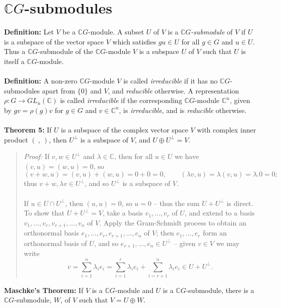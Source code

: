 \section {${\mathbb C}G$-submodules}
{\bf Definition:} Let $V$ be a ${\mathbb C}G$-module. A subset $U$ of
$V$ is a \emph{${\mathbb C}G$-submodule} of $V$ if $U$ is a subspace of the vector
space $V$ which satisfies $gu\in U$ for all $g\in G$ and $u\in U$.
Thus a ${\mathbb C}G$-submodule of the ${\mathbb C}G$-module $V$ is a subspace $U$ of $V$ such
that $U$ is itself a ${\mathbb C}G$-module.
\\
\\
{\bf Definition:}
A non-zero ${\mathbb C}G$-module $V$ is called
\emph{irreducible} if it has no ${\mathbb C}G$-submodules apart from
$\{0\}$ and $V$, and
\emph{reducible} otherwise. A representation $\rho:G\rightarrow GL_n({\mathbb C})$ is
called \emph{irreducible} if the corresponding ${\mathbb C}G$-module ${\mathbb C}^n$, given by
$gv=\rho(g)v$ for $g\in G$ and $v \in {\mathbb C}^n$, is \emph{irreducible}, and is
\emph{reducible} otherwise.
\\
\\
{\bf Theorem 5:} If $U$ is a subspace of the complex vector
space $V$ with complex inner product $(\ ,\ )$, then $U^\perp$ is a subspace of
$V$, and $U\oplus U^\perp=V$.
\begin{quote}
\emph{Proof:}
If $v,w \in U^\perp$ and $\lambda \in {\mathbb C}$, then for all $u \in U$ we have
$(v,u)=(w,u)=0$, so
$$(v+w,u)=(v,u)+(w,u)=0+0=0,\qquad (\lambda v,u)=\lambda(v,u)=\lambda.0=0;$$
thus $v+w,\lambda v\in U^\perp$, and so $U^\perp$ is a subspace of $V$.
\\
\\
If $u \in U \cap U^\perp$, then $(u,u)=0$, so 
$u=0$ -- thus the sum $U+U^\perp$ is direct. To show that $U+U^\perp=V$,
take a basis $v_1,\dots,v_r$ of $U$, and extend to a basis
$v_1,\dots,v_r,v_{r+1},\dots,v_n$ of $V$. Apply the Gram-Schmidt process to
obtain an orthonormal basis $e_1,\dots,e_r,e_{r+1},\dots,e_n$ of $V$; then
$e_1,\dots,e_r$ form an orthonormal basis of $U$, and so
$e_{r+1},\dots,e_n\in U^\perp$ -- given $v\in V$ we may write
$$v=\sum_{i=1}^n\lambda_ie_i
=\sum_{i=1}^r\lambda_ie_i+\sum_{i=r+1}^n\lambda_ie_i\in U+U^\perp.$$
\end{quote}
{\bf Maschke's Theorem:}  If $V$ is a ${\mathbb C}G$-module and
$U$ is a ${\mathbb C}G$-submodule, there is a 
${\mathbb C}G$-submodule, $W$, of $V$ such that $V= U \oplus W$.
